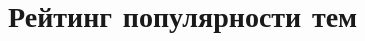 \chapter{Рейтинг популярности тем} \label{app:popular_topics}
\begin{comment}
\begin{longtable}[c]{|l|c|c|}
	\caption{Самые популярные темы, рассчитанные через отнесение документа к одной наиболее вероятной теме}\label{table:popular_topics_1} 
	\\ 
	\hline
	Порядок & Номер темы. & Количество записей \\ \hline
	\endfirsthead   \hline
	\multicolumn{3}{|c|}{\small\slshape (продолжение)}        \\ \hline
	Порядок & Номер темы. & Количество записей \\ \hline
	\endhead        \hline
	\multicolumn{3}{|r|}{\small\slshape продолжение следует}  \\ \hline
	\endfoot        \hline
	\endlastfoot
		1 & 19 & 1855 \\
		2 & 43 & 1845 \\
		3 & 39 & 1609 \\
		4 & 4 & 1443 \\
		5 & 10 & 1398 \\
		6 & 1 & 1347 \\
		7 & 29 & 1324 \\
		8 & 32 & 1277 \\
		9 & 7 & 1230 \\
		10 & 16 & 1098 \\
		11 & 45 & 1081 \\
		12 & 2 & 955 \\
		13 & 11 & 949 \\
		14 & 0 & 810 \\
		15 & 6 & 809 \\
		16 & 15 & 789 \\
		17 & 41 & 782 \\
		18 & 12 & 752 \\
		19 & 25 & 685 \\
		20 & 48 & 680 \\
		21 & 36 & 665 \\
		22 & 34 & 631 \\
		23 & 3 & 591 \\
		24 & 20 & 560 \\
		25 & 5 & 552 \\

\end{comment}
